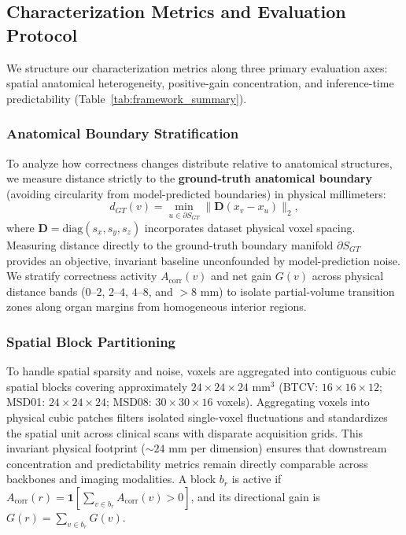 \subsection{Characterization Metrics and Evaluation Protocol}
\label{sec:formulations}

We structure our characterization metrics along three primary evaluation axes: spatial anatomical heterogeneity, positive-gain concentration, and inference-time predictability (Table~\ref{tab:framework_summary}).

\subsubsection{Anatomical Boundary Stratification}
\label{sec:boundary_dist}
To analyze how correctness changes distribute relative to anatomical structures, we measure distance strictly to the \textbf{ground-truth anatomical boundary} (avoiding circularity from model-predicted boundaries) in physical millimeters:
\begin{equation}
d_{GT}(v) = \min_{u \in \partial S_{GT}} \| \mathbf{D} (x_v - x_u) \|_2 ,
\end{equation}
where $\mathbf{D} = \text{diag}(s_x, s_y, s_z)$ incorporates dataset physical voxel spacing. Measuring distance directly to the ground-truth boundary manifold $\partial S_{GT}$ provides an objective, invariant baseline unconfounded by model-prediction noise. We stratify correctness activity $A_{\text{corr}}(v)$ and net gain $G(v)$ across physical distance bands ($0\text{--}2$, $2\text{--}4$, $4\text{--}8$, and $>8\text{~mm}$) to isolate partial-volume transition zones along organ margins from homogeneous interior regions.

\subsubsection{Spatial Block Partitioning}
\label{sec:blocks}
To handle spatial sparsity and noise, voxels are aggregated into contiguous cubic spatial blocks covering approximately $24 \times 24 \times 24\text{~mm}^3$ (BTCV: $16 \times 16 \times 12$; MSD01: $24 \times 24 \times 24$; MSD08: $30 \times 30 \times 16$ voxels). Aggregating voxels into physical cubic patches filters isolated single-voxel fluctuations and standardizes the spatial unit across clinical scans with disparate acquisition grids. This invariant physical footprint ($\sim 24\text{~mm}$ per dimension) ensures that downstream concentration and predictability metrics remain directly comparable across backbones and imaging modalities. A block $b_r$ is active if $A_{\text{corr}}(r) = \mathbf{1}[\sum_{v \in b_r} A_{\text{corr}}(v) > 0]$, and its directional gain is $G(r) = \sum_{v \in b_r} G(v)$.

